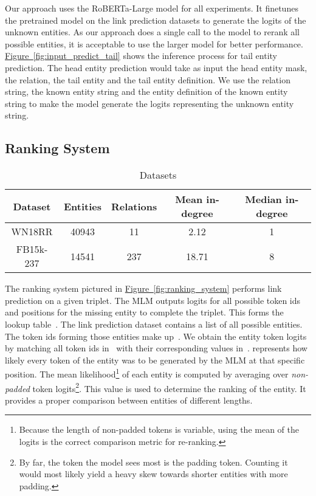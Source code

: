 \documentclass[11pt,a4paper]{article}
\newcommand{\RefFigure}[1]{\hyperref[#1]{Figure~\ref{#1}}}
\newcommand{\TableW}[3]{\begin{table*}[h!]
\begin{center}
  \caption{#3} 
  \vspace{-0.25\baselineskip}
  \label{#2}
  #1
\end{center}
\end{table*}}
\begin{document}
Our approach uses the RoBERTa-Large model for all experiments.
It finetunes the pretrained model on the link prediction datasets to generate the logits of the unknown entities.
As our approach does a single call to the model to rerank all possible entities, it is acceptable to use the larger model for better performance.
\RefFigure{fig:input_predict_tail} shows the inference process for tail entity prediction.
The head entity prediction would take as input the head entity mask, the relation, the tail entity and the tail entity definition.
We use the relation string, the known entity string and the entity definition of the known entity string to make the model generate the logits representing the unknown entity string.

\subsection{Ranking System}

\label{sec:datasets}
\TableW{\begin{tabular}{ccccc}
    \toprule
    Dataset & Entities & Relations & Mean in-degree & Median in-degree\\
    \midrule
    WN18RR & 40943 & 11 & 2.12 & 1\\
    FB15k-237 & 14541 & 237 & 18.71 & 8\\
    \bottomrule
  \end{tabular}}
{tab:datasets}
{Datasets}

The ranking system pictured in \RefFigure{fig:ranking_system} performs link prediction on a given triplet.
The MLM outputs logits for all possible token ids and positions for the missing entity to complete the triplet.
This forms the lookup table~.
The link prediction dataset contains a list of all possible entities.
The token ids forming those entities make up~.
We obtain the entity token logits~ by matching all token ids in~ with their corresponding values in~.
 represents how likely every token of the entity was to be generated by the MLM at that specific position.
The mean likelihood\footnote{Because the length of non-padded tokens is variable, using the mean of the logits is the correct comparison metric for re-ranking.} of each entity is computed by averaging  over \textit{non-padded} token logits\footnote{By far, the token the model sees most is the padding token. Counting it would most likely yield a heavy skew towards shorter entities with more padding.}.
This value is used to determine the ranking of the entity.
It provides a proper comparison between entities of different lengths.
\end{document}
